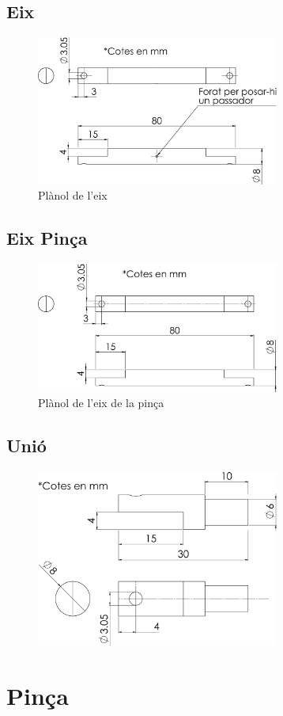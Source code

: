 \documentclass[a4paper, 12pt]{article}
\begin{document}
\subsection{Eix}

\begin{figure}[h!]
\centering
\includegraphics[width=8cm]{./sketch/eix}
\caption{Plànol de l'eix}
\end{figure}

\subsection{Eix Pinça}
\begin{figure}[h!]
\centering
\includegraphics[width=8cm]{./sketch/eix2}
\caption{Plànol de l'eix de la pinça}
\end{figure}

\subsection{Unió}
\begin{figure}[h!]
\centering
\includegraphics[width=8cm]{./sketch/unio}
\end{figure}

\newpage
\section{Pinça}
\end{document}
